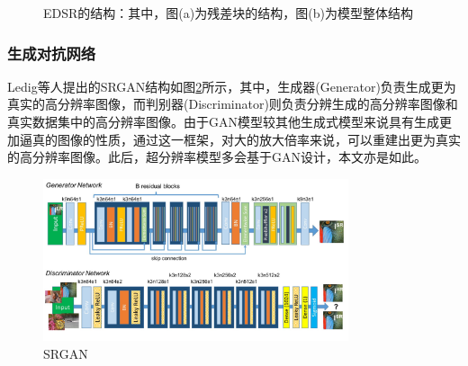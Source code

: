 \begin{figure}[htbp]
    \hfill
    \caption{EDSR的结构：其中，图(a)为残差块的结构，图(b)为模型整体结构}	
    \label{fig:EDSR-struct}
\end{figure}


\subsubsection*{生成对抗网络}
Ledig等人提出的SRGAN结构如图\ref{fig:SRGAN}所示，其中，生成器(Generator)负责生成更为真实的高分辨率图像，而判别器(Discriminator)则负责分辨生成的高分辨率图像和真实数据集中的高分辨率图像。由于GAN模型较其他生成式模型来说具有生成更加逼真的图像的性质，通过这一框架，对大的放大倍率来说，可以重建出更为真实的高分辨率图像。此后，超分辨率模型多会基于GAN设计，本文亦是如此。


\begin{figure}[htbp]
    \centering
    \includegraphics[width=0.8\textwidth]{imgs/SRGAN.png}
    \caption{SRGAN}
    \label{fig:SRGAN}
\end{figure}

